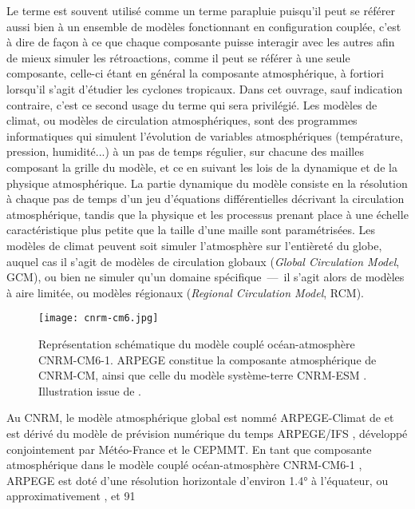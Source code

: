 \documentclass[../main.tex]{subfiles}
\begin{document}
Le terme  est souvent utilisé comme un terme parapluie puisqu'il peut se référer aussi bien à un ensemble de modèles fonctionnant en
configuration couplée, c'est à dire de façon à ce que chaque composante puisse interagir avec les autres afin de mieux simuler les rétroactions, comme il peut
se référer à une seule composante, celle-ci étant en général la composante atmosphérique, à fortiori lorsqu'il s'agit d'étudier les cyclones tropicaux. Dans cet
ouvrage, sauf indication contraire, c'est ce second usage du terme qui sera privilégié. Les modèles de climat, ou modèles de circulation atmosphériques, sont
des programmes informatiques qui simulent l'évolution de variables atmosphériques (température, pression, humidité...) à un pas de temps régulier, sur chacune
des mailles composant la grille du modèle, et ce en suivant les lois de la dynamique et de la physique atmosphérique. La partie dynamique du modèle consiste en
la résolution à chaque pas de temps d'un jeu d'équations différentielles décrivant la circulation atmosphérique, tandis que la physique et les processus prenant
place à une échelle caractéristique plus petite que la taille d'une maille sont paramétrisées. Les modèles de climat peuvent soit simuler l'atmosphère sur
l'entièreté du globe, auquel cas il s'agit de modèles de circulation globaux (\textit{Global Circulation Model}, GCM), ou bien ne simuler qu'un domaine
spécifique~---~il s'agit alors de modèles à aire limitée, ou modèles régionaux (\textit{Regional Circulation Model}, RCM).
%
\begin{figure}[t]
    \centering
    \texttt{[image: cnrm-cm6.jpg]}
    \caption{Représentation schématique du modèle couplé océan-atmosphère CNRM-CM6-1. \hbox{ARPEGE} constitue la composante atmosphérique de CNRM-CM, ainsi que
    celle du modèle système-terre CNRM-ESM \parencite{seferian_evaluation_2019}. Illustration issue de \cite{voldoire_evaluation_2019}.}
    \label{fig:cnrm-cm6}
\end{figure}
%
Au CNRM, le modèle atmosphérique global est nommé ARPEGE-Climat \parencite[Action de Recherche Petite Échelle Grande Échelle,][]{deque_arpege_1994} de  et est
dérivé du modèle de prévision numérique du temps ARPEGE/IFS \parencite[\textit{Integrated Forecast System},][]{courtier_arpege_1991}, développé conjointement
par Météo-France et le CEPMMT. En tant que composante atmosphérique dans le modèle couplé océan-atmosphère \nolinebreak CNRM-CM6-1
\parencite{voldoire_evaluation_2019}, ARPEGE est doté d'une résolution horizontale d'environ \ang{1.4} à l'équateur, ou approximativement , et \num{91}
\end{document}
